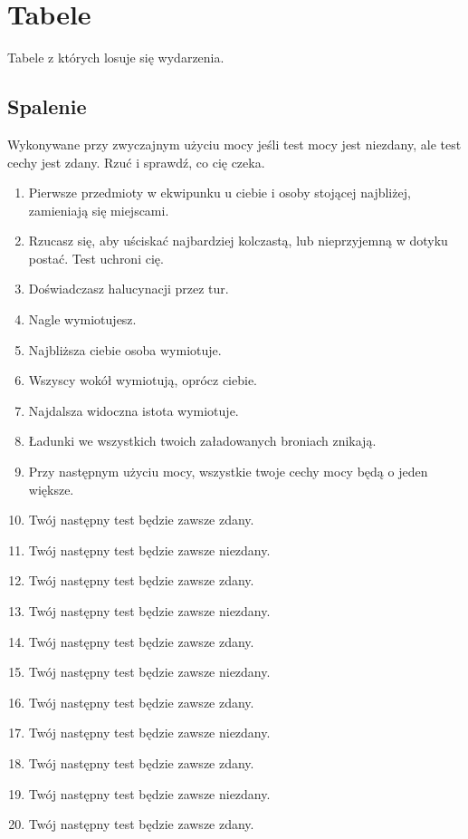 \chapter{Tabele}
Tabele z których losuje się wydarzenia.

\section{Spalenie}
Wykonywane przy zwyczajnym użyciu mocy jeśli test mocy jest niezdany, ale test cechy jest zdany.
Rzuć \dc{} i sprawdź, co cię czeka.

\begin{enumerate}
	\item Pierwsze przedmioty w ekwipunku u ciebie i osoby stojącej najbliżej, zamieniają się miejscami.
	\item Rzucasz się, aby uściskać najbardziej kolczastą, lub nieprzyjemną w dotyku postać. Test \abh{} uchroni cię.
	\item Doświadczasz halucynacji przez \dvi{} tur.
	\item Nagle wymiotujesz.
	\item Najbliższa ciebie osoba wymiotuje.
	\item Wszyscy wokół wymiotują, oprócz ciebie.
	\item Najdalsza widoczna istota wymiotuje.
	\item Ładunki we wszystkich twoich załadowanych broniach znikają.
	\item Przy następnym użyciu mocy, wszystkie twoje cechy mocy będą o jeden większe.
	\item Twój następny test \abi{} będzie zawsze zdany.
	\item Twój następny test \abi{} będzie zawsze niezdany.
	\item Twój następny test \abs{} będzie zawsze zdany.
	\item Twój następny test \abs{} będzie zawsze niezdany.
	\item Twój następny test \abp{} będzie zawsze zdany.
	\item Twój następny test \abp{} będzie zawsze niezdany.
	\item Twój następny test \aba{} będzie zawsze zdany.
	\item Twój następny test \aba{} będzie zawsze niezdany.
	\item Twój następny test \abh{} będzie zawsze zdany.
	\item Twój następny test \abh{} będzie zawsze niezdany.
	\item Twój następny test \abt{} będzie zawsze zdany.

\end{enumerate}

